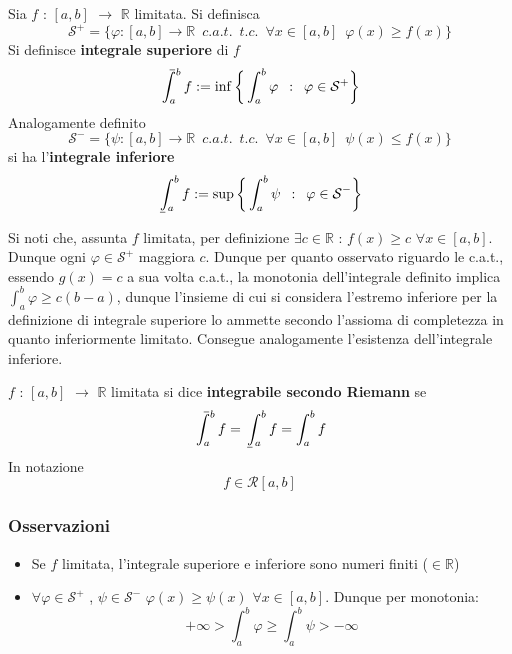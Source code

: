 \documentclass[10pt, oneside]{book}
\theoremstyle{plain}
\def\upint{\mathchoice%
    {\mkern13mu\overline{\vphantom{\intop}\mkern7mu}\mkern-20mu}%
    {\mkern7mu\overline{\vphantom{\intop}\mkern7mu}\mkern-14mu}%
    {\mkern7mu\overline{\vphantom{\intop}\mkern7mu}\mkern-14mu}%
    {\mkern7mu\overline{\vphantom{\intop}\mkern7mu}\mkern-14mu}%
  \int}
\def\lowint{\mkern3mu\underline{\vphantom{\intop}\mkern7mu}\mkern-10mu\int}
\begin{document}
\begin{defin}Sia $f$ : $[a,b]$ $\rightarrow$ $\mathbb{R}$ limitata. 
Si definisca 
\[\mathcal{S}^+ = \{\varphi : [a,b] \rightarrow \mathbb{R} \enspace c.a.t. \enspace t.c. \enspace \forall x \in [a,b] \enspace \varphi(x) \geq f(x)\}\]
Si definisce \textbf{integrale superiore} di $f$
\[\upint_a^b f := \inf\bigg\{\int_a^b \varphi \enspace : \enspace \varphi \in \mathcal{S}^+\bigg\}\]
Analogamente definito
\[\mathcal{S}^- = \{\psi : [a,b] \rightarrow \mathbb{R} \enspace c.a.t. \enspace t.c. \enspace \forall x \in [a,b] \enspace \psi(x) \leq f(x)\}\]
si ha l'\textbf{integrale inferiore}
\[\lowint_a^b f := \sup\bigg\{\int_a^b \psi \enspace : \enspace \varphi \in \mathcal{S}^-\bigg\}\]
\end{defin}

Si noti che, assunta $f$ limitata, per definizione $\exists c \in \mathbb{R}$ : $f(x) \geq c$ $\forall x \in [a,b]$. Dunque ogni $\varphi \in \mathcal{S}^+$ maggiora $c$. Dunque per quanto osservato riguardo le c.a.t., essendo $g(x) = c$ a sua volta c.a.t., la monotonia dell'integrale definito implica $\int_a^b \varphi \geq c(b-a)$, dunque l'insieme di cui si considera l'estremo inferiore per la definizione di integrale superiore lo ammette secondo l'assioma di completezza in quanto inferiormente limitato. Consegue analogamente l'esistenza dell'integrale inferiore.

\begin{defin}
    $f$ : $[a,b]$ $\rightarrow$ $\mathbb{R}$ limitata si dice \textbf{integrabile secondo Riemann} se 
    \[\upint_a^b f = \lowint_a^b f = \int_a^b f\]
    In notazione
    \[f \in \mathcal{R}[a,b]\]
\end{defin}
\subsubsection*{Osservazioni}
\begin{itemize}[label = $\square$]
    \item Se $f$ limitata, l'integrale superiore e inferiore sono numeri finiti ($\in \mathbb{R}$)
    \item $\forall \varphi \in \mathcal{S}^+$ , $\psi \in \mathcal{S}^-$ $\varphi(x) \geq \psi(x)$ $\forall x \in [a,b]$. Dunque per monotonia:
    \[+\infty > \int_a^b \varphi \geq \int_a^b \psi > - \infty\]
\end{itemize}
\end{document}
